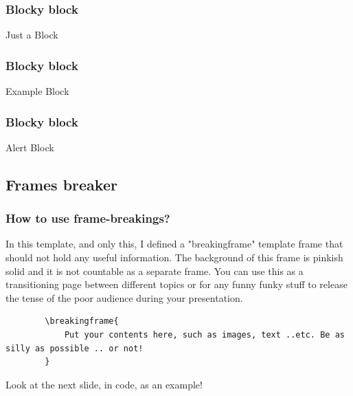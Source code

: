 \documentclass{EESD}
\begin{document}
\begin{frame}
\frametitle{Blocky block}
\begin{block}{Just a Block}
\lipsum[1]
\end{block}
\end{frame}

\begin{frame}
\frametitle{Blocky block}
\begin{exampleblock}{Example Block}
\lipsum[1]
\end{exampleblock}
\end{frame}

\begin{frame}
\frametitle{Blocky block}
\begin{alertblock}{Alert Block}
\lipsum[1]
\end{alertblock}
\end{frame}

\subsection{Frames breaker}
\begin{frame}[fragile]
\frametitle{How to use frame-breakings?}
    In this template, and only this, I defined a "breakingframe" template frame that should not hold any useful information. The background of this frame is pinkish solid and it is not countable as a separate frame. You can use this as a transitioning page between different topics or for any funny funky stuff to release the tense of the poor audience during your presentation.
    \vspace{10pt}
    \begin{lstlisting}
        \breakingframe{
            Put your contents here, such as images, text ..etc. Be as silly as possible .. or not!
        }
    \end{lstlisting}
    \vspace{10pt}
    Look at the next slide, in code, as an example!
\end{frame}
\end{document}
